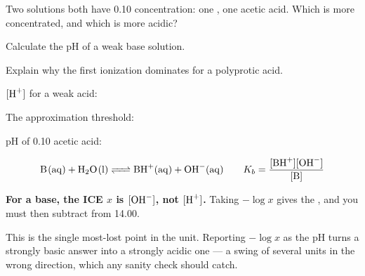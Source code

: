 \documentclass{apchem-notes}
\begin{document}
\begin{exitticket}
Two solutions both have \SI{0.10}{\Molar} concentration: one , one
acetic acid. Which is more concentrated, and which is more acidic?
\end{exitticket}


\begin{objectives}
  \item Calculate the pH of a weak base solution.
  \item Explain why the first ionization dominates for a polyprotic acid.
\end{objectives}


\begin{warmup}[3]
  \item $[\ce{H+}]$ for a weak acid: 
  \item The approximation threshold: 
  \item pH of \SI{0.10}{\Molar} acetic acid: 
\end{warmup}



\[ \ce{B(aq) + H2O(l) <=> BH+(aq) + OH^-(aq)} \qquad
   K_b = \frac{[\ce{BH+}][\ce{OH^-}]}{[\ce{B}]} \]

\begin{apctrap}
\textbf{For a base, the ICE $x$ is $[\ce{OH-}]$, not $[\ce{H+}]$.} Taking
$-\log x$ gives the , and you must then subtract
from 14.00.

This is the single most-lost point in the unit. Reporting $-\log x$ as the
pH turns a strongly basic answer into a strongly acidic one --- a swing of
several units in the wrong direction, which any sanity check should catch.
\end{apctrap}
\end{document}
